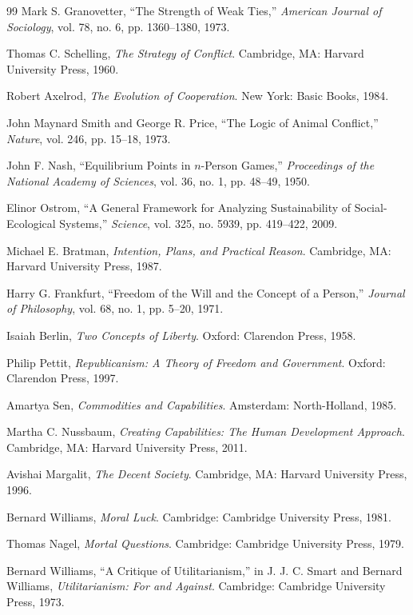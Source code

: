 \documentclass[11pt,oneside]{book}
\theoremstyle{definition}
\theoremstyle{remark}
\begin{document}
\begin{thebibliography}{99}
 Mark S. Granovetter, ``The Strength of Weak Ties,'' \emph{American Journal of Sociology}, vol.
  78, no. 6, pp. 1360--1380, 1973.

 Thomas C. Schelling, \emph{The Strategy of Conflict}. Cambridge, MA: Harvard University Press,
  1960.

 Robert Axelrod, \emph{The Evolution of Cooperation}. New York: Basic Books, 1984.

 John Maynard Smith and George R. Price, ``The Logic of Animal Conflict,'' \emph{Nature}, vol.
  246, pp. 15--18, 1973.

 John F. Nash, ``Equilibrium Points in \(n\)-Person Games,'' \emph{Proceedings of the National
  Academy of Sciences}, vol. 36, no. 1, pp. 48--49, 1950.

 Elinor Ostrom, ``A General Framework for Analyzing Sustainability of Social-Ecological
  Systems,'' \emph{Science}, vol. 325, no. 5939, pp. 419--422, 2009.

 Michael E. Bratman, \emph{Intention, Plans, and Practical Reason}. Cambridge, MA: Harvard
  University Press, 1987.

 Harry G. Frankfurt, ``Freedom of the Will and the Concept of a Person,'' \emph{Journal of
  Philosophy}, vol. 68, no. 1, pp. 5--20, 1971.

 Isaiah Berlin, \emph{Two Concepts of Liberty}. Oxford: Clarendon Press, 1958.

 Philip Pettit, \emph{Republicanism: A Theory of Freedom and Government}. Oxford: Clarendon
  Press, 1997.

 Amartya Sen, \emph{Commodities and Capabilities}. Amsterdam: North-Holland, 1985.

 Martha C. Nussbaum, \emph{Creating Capabilities: The Human Development Approach}. Cambridge, MA:
  Harvard University Press, 2011.

 Avishai Margalit, \emph{The Decent Society}. Cambridge, MA: Harvard University Press, 1996.

 Bernard Williams, \emph{Moral Luck}. Cambridge: Cambridge University Press, 1981.

 Thomas Nagel, \emph{Mortal Questions}. Cambridge: Cambridge University Press, 1979.

 Bernard Williams, ``A Critique of Utilitarianism,'' in J. J. C. Smart and Bernard Williams,
  \emph{Utilitarianism: For and Against}. Cambridge: Cambridge University Press, 1973.


\end{thebibliography}
\end{document}

